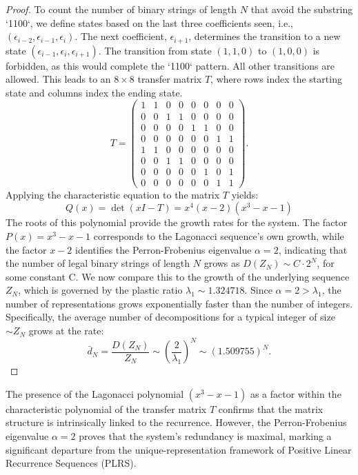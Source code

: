 \documentclass[11pt]{amsart}
\theoremstyle{plain}
\numberwithin{equation}{section} %
\numberwithin{table}{section} %
\numberwithin{figure}{section}
\begin{document}
\begin{proof}
		To count the number of binary strings of length $N$ that avoid the substring `1100`, we define states based on the last three coefficients seen, i.e., $(\epsilon_{i-2}, \epsilon_{i-1}, \epsilon_i)$. The next coefficient, $\epsilon_{i+1}$, determines the transition to a new state $(\epsilon_{i-1}, \epsilon_i, \epsilon_{i+1})$. The transition from state $(1,1,0)$ to $(1,0,0)$ is forbidden, as this would complete the `1100` pattern. All other transitions are allowed. This leads to an $8 \times 8$ transfer matrix $T$, where rows index the starting state and columns index the ending state.
		\[ T = \begin{pmatrix}
			1 & 1 & 0 & 0 & 0 & 0 & 0 & 0 \\ %
			0 & 0 & 1 & 1 & 0 & 0 & 0 & 0 \\ %
			0 & 0 & 0 & 0 & 1 & 1 & 0 & 0 \\ %
			0 & 0 & 0 & 0 & 0 & 0 & 1 & 1 \\ %
			1 & 1 & 0 & 0 & 0 & 0 & 0 & 0 \\ %
			0 & 0 & 1 & 1 & 0 & 0 & 0 & 0 \\ %
			0 & 0 & 0 & 0 & 0 & 1 & 0 & 1 \\ %
			0 & 0 & 0 & 0 & 0 & 0 & 1 & 1   %
		\end{pmatrix}. \]
		Applying the characteristic equation to the matrix $T$ yields:
		\[ Q(x) = \det(xI - T) = x^4(x - 2)(x^3 - x - 1) \]
		The roots of this polynomial provide the growth rates for the system. The factor $P(x)=x^3 - x - 1$ corresponds to the Lagonacci sequence's own growth, while the factor $x - 2$ identifies the Perron-Frobenius eigenvalue
		\( \alpha = 2 \),  indicating that the number of legal binary strings of length $N$ grows as $D(Z_N) \sim C \cdot 2^N$,
		for some constant C.
		We now compare this to the growth of the underlying sequence $Z_N$, which is governed by the plastic ratio $\lambda_1 \sim 1.324718$. 
		Since $\alpha = 2 > \lambda_1$, the number of representations grows exponentially faster than the number of integers. Specifically, the average number of decompositions for a typical integer of size $\sim Z_N$ grows at the rate:
		\[ \bar{d}_N = \frac{D(Z_N)}{Z_N} \sim \left( \frac{2}{\lambda_1} \right)^N \sim (1.509755)^N. \]
		
	\end{proof}
	
	The presence of the Lagonacci polynomial $(x^3 - x - 1)$ as a factor within the characteristic polynomial of the transfer matrix $T$ confirms that the matrix structure is intrinsically linked to the recurrence. However, the Perron-Frobenius eigenvalue $\alpha = 2$ proves that the system's redundancy is maximal, marking a significant departure from the unique-representation framework of Positive Linear Recurrence Sequences (PLRS).
	
\end{document}
